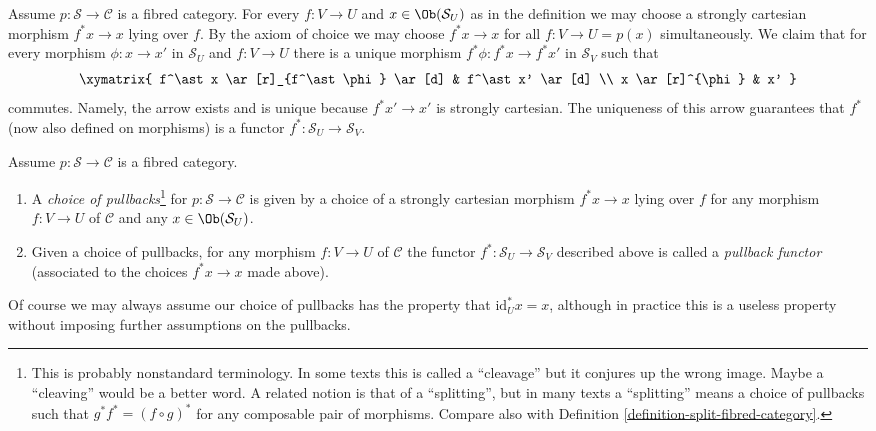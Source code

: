 \noindent
Assume $p : \mathcal{S} \to \mathcal{C}$ is a fibred category.
For every $f : V \to U$ and $x\in \Ob(\mathcal{S}_U)$
as in the definition we may choose a strongly cartesian morphism
$f^\ast x \to x$ lying over $f$. By the axiom of choice we may choose
$f^*x \to x$ for all $f: V \to U = p(x)$ simultaneously.
We claim that for every morphism $\phi : x \to x'$ in $\mathcal{S}_U$
and $f : V \to U$ there is a unique
morphism $f^\ast \phi : f^\ast x \to f^\ast x'$ in $\mathcal{S}_V$
such that
$$
\xymatrix{
f^\ast x \ar[r]_{f^\ast \phi} \ar[d] & f^\ast x' \ar[d] \\
x \ar[r]^{\phi} & x' }
$$
commutes. Namely, the arrow exists and is unique because $f^*x' \to x'$ is
strongly cartesian. The uniqueness of this arrow guarantees that
$f^\ast$ (now also defined on morphisms) is a
functor $ f^\ast : \mathcal{S}_U \to \mathcal{S}_V$.

\begin{definition}
\label{definition-pullback-functor-fibred-category}
Assume $p : \mathcal{S} \to \mathcal{C}$ is a fibred category.
\begin{enumerate}
\item A {\it choice of pullbacks}\footnote{This is probably nonstandard
terminology. In some texts this is called a ``cleavage''  but it conjures up
the wrong image. Maybe a ``cleaving'' would be a better word.
A related notion is that of a ``splitting'', but in many texts a ``splitting''
means a choice of pullbacks such that $g^*f^* = (f \circ g)^*$
for any composable pair of morphisms. Compare
also with Definition \ref{definition-split-fibred-category}.}
for $p : \mathcal{S} \to \mathcal{C}$
is given by a choice of a strongly cartesian morphism
$f^\ast x \to x$ lying over $f$ for any morphism
$f: V \to U$ of $\mathcal{C}$ and any $x \in \Ob(\mathcal{S}_U)$.
\item Given a choice of pullbacks,
for any morphism $f : V \to U$ of $\mathcal{C}$
the functor $f^* : \mathcal{S}_U \to \mathcal{S}_V$ described
above is called a {\it pullback functor} (associated to the choices
$f^*x \to x$ made above).
\end{enumerate}
\end{definition}

\noindent
Of course we may always assume our choice of pullbacks has the property that
$\text{id}_U^*x = x$, although in practice this is a useless property
without imposing further assumptions on the pullbacks.

